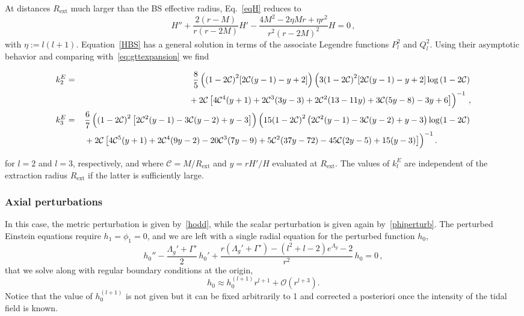 \documentclass[aps,twocolumn,showpacs,preprintnumbers,nofootinbib,prd,superscriptaddress,groupedaddress,10pt]{revtex4-1}
\def\be{\begin{equation}}
\def\ee{\end{equation}}
\newcommand{\beq}{\begin{eqnarray}}
\newcommand{\eeq}{\end{eqnarray}}
\newcommand{\C}{\mathcal{C}}
\begin{document}
At distances $R_\text{ext}$ much larger than the BS effective radius, Eq.~\eqref{eqH} reduces to
%
\be\label{HBS}
H'' + \frac{2(r-M)}{r(r-2M)} H' -\frac{4 M^2 -2\eta M r + \eta r^2}{r^2 (r-2 M)^2} H = 0\,,
\ee
%
with ${\eta}:=l(l+1)$. Equation~\eqref{HBS} has a general solution in terms of the associate Legendre functions $P^2_l$ and $Q^2_l$.
Using their asymptotic behavior and comparing with~\eqref{eq:gttexpansion} we find~\cite{Hinderer:2007mb}
%
\begin{widetext}
\beq
k_2^E &=& \frac{8}{5}\left({(1-2\C)}^2 [2\C (y-1)-y+2]\right)
\left( 3{(1-2\C)}^2 [2\C (y-1)-y+2] \log\left({1-2\C}\right)\right.\nonumber\\
%
&&\left.\vphantom{{(1-2\C)}^2} + 2\C\left[4\C^4 (y+1) + 2\C^3 (3y-3) + 2\C^2 (13-11y) + 3\C (5y-8) - 3y+6\right]\right)^{-1}\,,\\
k_3^E &=& \frac{6}{7} \left({(1-2\C)}^2 \left[2\C^2 (y-1)-3\C (y-2)+y-3\right]\right)
\left(15 {(1-2\C)}^2 \left(2\C^2 (y-1)-3 \C (y-2)+y-3\right) \log (1-2\C)\right.\nonumber\\
&&\left.\vphantom{{(1-2\C)}^2} + 2\C \left[4\C^5 (y+1)+2\C^4 (9 y-2)-20\C^3 (7 y-9)+5\C^2 (37 y-72)-45\C (2 y-5)+15 (y-3)\right]\right)^{-1}.\qquad\qquad
\eeq
\end{widetext}
%
for $l=2$ and $l=3$, respectively, and where $\C=M/R_\text{ext}$ and $y=rH'/H$ evaluated at $R_\text{ext}$.
The values of $k_l^E$ are independent of the extraction radius $R_\text{ext}$ if the latter
is sufficiently large.

\subsubsection{Axial perturbations}
In this case, the metric perturbation is given by~\eqref{hodd}, while the scalar perturbation
is given again by~\eqref{phiperturb}.
%
The perturbed Einstein equations require $h_1=\phi_1=0$, and we are left with a single
radial equation for the perturbed function $h_0$,
\be
h_0'' - \frac{\Lambda_g'+\Gamma'}{2}\,h_0' 
+\frac{r (\Lambda_g'+\Gamma') - (l^2+l-2) e^{\Lambda_g}-2}{r^2}\,h_0 = 0\,,\label{eqh0}
\ee
that we solve along with regular boundary conditions at the origin,
\be
h_0\approx h_0^{(l+1)} r^{l+1} + \mathcal{O}\left(r^{l+3}\right).
\ee
%
Notice that the value of $h_0^{(l+1)}$ is not given but it can be fixed arbitrarily to 1
and corrected a posteriori once the intensity of the tidal field is known.
\end{document}
